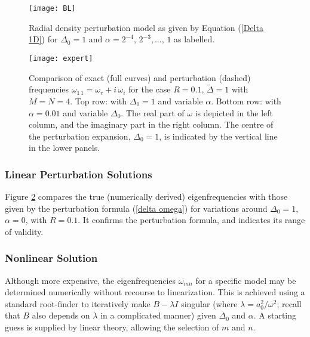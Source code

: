 \documentclass[12pt]{iopart}
\newcommand{\ri}{{i}}
\begin{document}
\begin{figure}
\begin{center}
\texttt{[image: BL]}
\caption{Radial density perturbation model as given by Equation (\ref{Delta 1D}) 
for $\Delta_0=1$ and $\alpha=2^{-4},\,2^{-3},\ldots,\,1$ as labelled.}
\label{fig:BL}
\end{center}
\end{figure}


\begin{figure}
\begin{center}
\texttt{[image: expert]}
\caption{Comparison of exact (full curves) and perturbation (dashed) frequencies $\omega_{1\,1}=\omega_r+\ri\,\omega_i$ for the case $R=0.1$, $\tilde\Delta=1$ with $M=N=4$. Top row: with $\Delta_0=1$ and variable $\alpha$. Bottom row: with $\alpha=0.01$ and variable $\Delta_0$. The real part of $\omega$ is depicted in the left column, and the imaginary part in the right column. The centre of the perturbation expansion, $\Delta_0=1$, is indicated by the vertical line in the lower panels.}
\label{fig:expert}
\end{center}
\end{figure}

\subsubsection{Linear Perturbation Solutions}

Figure \ref{fig:expert} compares the true (numerically derived) eigenfrequencies with those given by the perturbation formula (\ref{delta omega}) for variations around $\Delta_0=1$, $\alpha=0$, with $R=0.1$. It confirms the perturbation formula, and indicates its range of validity.

\subsubsection{Nonlinear Solution}

Although more expensive, the eigenfrequencies $\omega_{mn}$ for a specific model may be determined numerically without recourse to linearization. This is achieved using a standard root-finder to iteratively make $B-\lambda I$ singular (where $\lambda=a_0^2/\omega^2$; recall that $B$ also depends on $\lambda$ in a complicated manner) given $\Delta_0$ and $\alpha$. A starting guess is supplied by linear theory, allowing the selection of $m$ and $n$.
\end{document}
